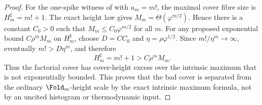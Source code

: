 \begin{proof}
For the one-spike witness of  with
\(a_m=m!\), the maximal cover fibre size is \(H_m^\sharp=m!+1\).  The exact height
law gives \(M_m=\Theta(\varphi^{m/2})\).  Hence there is a constant \(C_0>0\) such
that \(M_m\le C_0\varphi^{m/2}\) for all \(m\).  For any proposed exponential bound
\(C\rho^mM_m\) on \(H_m^\sharp\), choose \(D=C C_0\) and
\(\eta=\rho\varphi^{1/2}\).  Since \(m!/\eta^m\to\infty\), eventually
\(m!>D\eta^m\), and therefore
\[
  H_m^\sharp=m!+1>C\rho^mM_m .
\]
Thus the factorial cover has cover-height excess over the intrinsic maximum that
is not exponentially bounded.  This proves that the bad cover is separated from
the ordinary \(\Fold_m\)-height scale by the exact intrinsic maximum formula, not
by an uncited histogram or thermodynamic input.
\end{proof}

